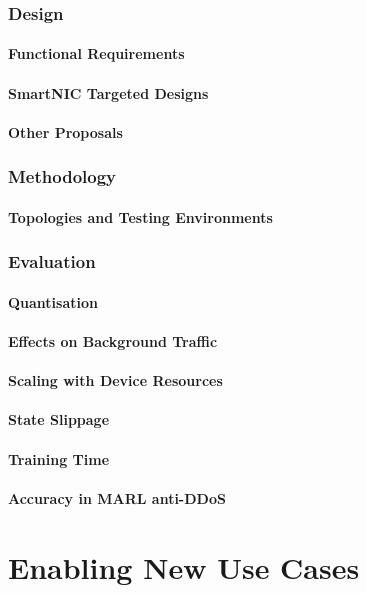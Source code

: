 \documentclass[twoside,hidelinks]{glasgowthesis}
\begin{document}
\section{Design}
\subsection{Functional Requirements}
\subsection{SmartNIC Targeted Designs}
\subsection{Other Proposals}
\section{Methodology}
\subsection{Topologies and Testing Environments}
\section{Evaluation}
\subsection{Quantisation}
\subsection{Effects on Background Traffic}
\subsection{Scaling with Device Resources}
\subsection{State Slippage}
\subsection{Training Time}
\subsection{Accuracy in MARL anti-DDoS}


\part{Enabling New Use Cases}
\end{document}
